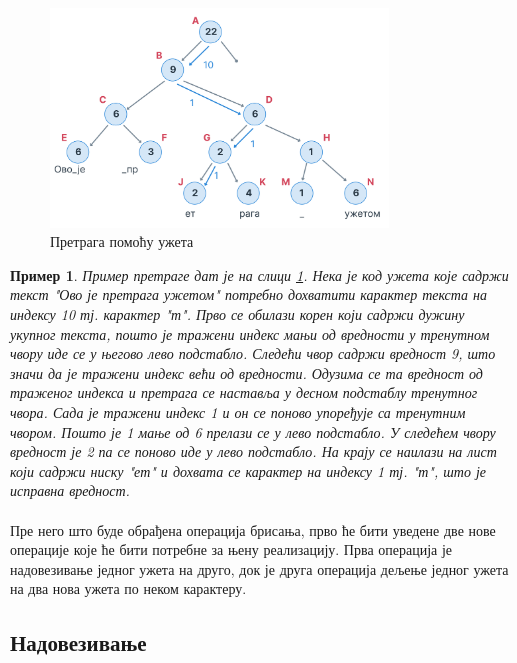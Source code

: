 \documentclass[12pt,oneside]{memoir}
\newtheorem{exmp}{Пример}
\begin{document}
\begin{figure}
  \centering
  \includegraphics[width=0.8\textwidth]{images/rope_search_1.png}
  \caption{Претрага помоћу ужета}
  \label{fig:rope_search}
\end{figure}

\begin{exmp}
Пример претраге дат је на слици \ref{fig:rope_search}.
Нека је код ужета које садржи текст \textit{"Ово је претрага ужетом"} потребно дохватити карактер текста на индексу 10 тј. карактер \textit{"т"}. Прво се обилази корен 
који садржи дужину укупног текста, пошто је тражени индекс мањи од вредности у тренутном
чвору иде се у његово лево подстабло. Следећи чвор садржи вредност 9, што значи да је
тражени индекс већи од вредности. Одузима се та вредност од траженог индекса и претрага се
наставља у десном подстаблу тренутног чвора. Сада је тражени индекс 1 и он се поново
упоређује са тренутним чвором. Пошто је 1 мање од 6 прелази се у лево подстабло. 
У следећем чвору вредност је 2 па се поново иде у лево подстабло. На крају се наилази на
лист који садржи ниску \textit{"ет"} и дохвата се карактер на индексу 1 тј. \textit{"т"},
што је исправна вредност.

\end{exmp}

\paragraph{}
Пре него што буде обрађена операција брисања, прво ће бити уведене две нове операције које ће бити потребне за њену реализацију. Прва операција је надовезивање једног ужета на друго,
док је друга операција дељење једног ужета на два нова ужета по неком карактеру.


\subsection{Надовезивање}
\end{document}

